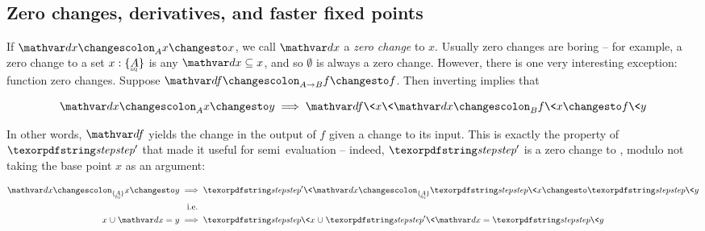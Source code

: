 
\subsection{Zero changes, derivatives, and faster fixed points}
\label{sec:derivatives}

If $\changesat A \dx x x$, we call $\dx$ a \emph{zero change} to $x$. Usually
zero changes are boring -- for example, a zero change to a set $x :
\tseteq{A}$ is any $\dx \subseteq x$, and so $\emptyset$ is always a zero
change.
%
However, there is one very interesting exception: function zero changes. Suppose
$\changesat{A \to B}{\df}{f}{f}$. Then inverting  implies that

\begin{equation*}
  \changesat A \dx x y \implies \changesat B{\df\<x\<\dx}{f\<x}{f\<y}
\end{equation*}

\noindent
In other words, $\df$ yields the change in the output of $f$ given a change to
its input.
%
This is exactly the property of $\name{step}'$ that made it useful for
semi\naive\ evaluation -- indeed, $\name{step}'$ is a zero change to
, modulo not taking the base point $x$ as an argument:


\begin{align*}
  \changesat{\tseteq A} \dx x y
  &\implies
  \changesat{\tseteq A}{\name{step}'\<\dx}{\name{step}\<x}{\name{step}\<y}
  \\
  &\hphantom{x.}\text{i.e.}
  \\
  x \cup \dx = y
  &\implies
  \name{step}\<x \cup \name{step}'\<\dx = \name{step}\<y
\end{align*}


